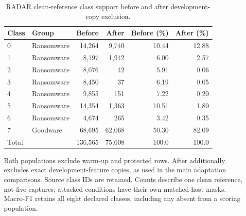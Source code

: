 \begin{table}[htbp]
\centering\small\singlespacing
\caption{RADAR clean-reference class support before and after development-copy exclusion.}\label{tab:radar_scoring_support}
\setlength{\tabcolsep}{4pt}
\renewcommand{\arraystretch}{1.15}
\begin{tabular}{@{}llrrrr@{}}
\toprule
Class & Group & Before & After & Before (\%) & After (\%) \\
\midrule
0 & Ransomware & 14,264 & 9,740 & 10.44 & 12.88 \\
1 & Ransomware & 8,197 & 1,942 & 6.00 & 2.57 \\
2 & Ransomware & 8,076 & 42 & 5.91 & 0.06 \\
3 & Ransomware & 8,450 & 37 & 6.19 & 0.05 \\
4 & Ransomware & 9,855 & 151 & 7.22 & 0.20 \\
5 & Ransomware & 14,354 & 1,363 & 10.51 & 1.80 \\
6 & Ransomware & 4,674 & 265 & 3.42 & 0.35 \\
7 & Goodware & 68,695 & 62,068 & 50.30 & 82.09 \\
Total &  & 136,565 & 75,608 & 100.0 & 100.0 \\
\bottomrule
\end{tabular}
\par\smallskip\begin{minipage}{\textwidth}\footnotesize Both populations exclude warm-up and protected rows. After additionally excludes exact development-feature copies, as used in the main adaptation comparisons. Source class IDs are retained. Counts describe one clean reference, not five captures; attacked conditions have their own matched host masks. Macro-F1 retains all eight declared classes, including any absent from a scoring population.\end{minipage}
\end{table}
